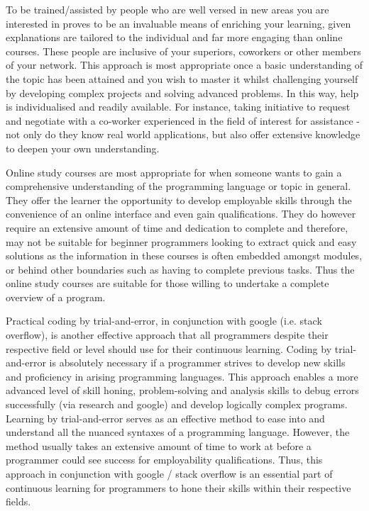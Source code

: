 \documentclass[a4paper, 11pt]{report}
\begin{document}
To be trained/assisted by people who are well versed in new areas you are interested in proves to be an invaluable means of enriching your learning, given explanations are tailored to the individual and far more engaging than online courses. These people are inclusive of your superiors, coworkers or other members of your network. This approach is most appropriate once a basic understanding of the topic has been attained and you wish to master it whilst challenging yourself by developing complex projects and solving advanced problems. In this way, help is individualised and readily available. For instance, taking initiative to request and negotiate with a co-worker experienced in the field of interest for assistance - not only do they know real world applications, but also offer extensive knowledge to deepen your own understanding.

Online study courses are most appropriate for when someone wants to gain a comprehensive understanding of the programming language or topic in general. They offer the learner the opportunity to develop employable skills through the convenience of an online interface and even gain qualifications. They do however require an extensive amount of time and dedication to complete and therefore, may not be suitable for beginner programmers looking to extract quick and easy solutions as the information in these courses is often embedded amongst modules, or behind other boundaries such as having to complete previous tasks. Thus the online study courses are suitable for those willing to undertake a complete overview of a program.

Practical coding by trial-and-error, in conjunction with google (i.e. stack overflow), is another effective approach that all programmers despite their respective field or level should use for their continuous learning. Coding by trial-and-error is absolutely necessary if a programmer strives to develop new skills and proficiency in arising programming languages. This approach enables a more advanced level of skill honing, problem-solving and analysis skills to debug errors successfully (via research and google) and develop logically complex programs. Learning by trial-and-error serves as an effective method to ease into and understand all the nuanced syntaxes of a programming language. However, the method usually takes an extensive amount of time to work at before a programmer could see success for employability qualifications. Thus, this approach in conjunction with google / stack overflow is an essential part of continuous learning for programmers to hone their skills within their respective fields.
\end{document}

